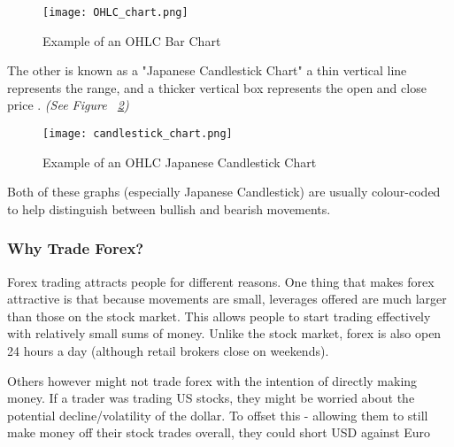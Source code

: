             \begin{figure}[h]
                \centering
                \texttt{[image: OHLC\_chart.png]}
                \caption{Example of an OHLC Bar Chart \cite{barchart_OHLC}}
                \label{fig:barchart_ex}
            \end{figure}

            The other is known as a "Japanese Candlestick Chart" a thin vertical line represents the range, and a thicker vertical box represents the open and close price \cite{candlestick_OHLC}. \textit{(See Figure ~\ref{fig:candlestick_ex})} 

            \begin{figure}[h]
                \centering
                \texttt{[image: candlestick\_chart.png]}
                \caption{Example of an OHLC Japanese Candlestick Chart \cite{candlestick_OHLC}}
                \label{fig:candlestick_ex}
            \end{figure}

            Both of these graphs (especially Japanese Candlestick) are usually colour-coded to help distinguish between bullish and bearish movements.
        


            \subsubsection{Why Trade Forex?}
            Forex trading attracts people for different reasons. One thing that makes forex attractive is that because movements are small, leverages offered are much larger than those on the stock market. This allows people to start trading effectively with relatively small sums of money. Unlike the stock market, forex is also open 24 hours a day (although retail brokers close on weekends).

            Others however might not trade forex with the intention of directly making money. If a trader was trading US stocks, they might be worried about the potential decline/volatility of the dollar. To offset this - allowing them to still make money off their stock trades overall, they could short USD against Euro\cite{investopedia_beginner}


